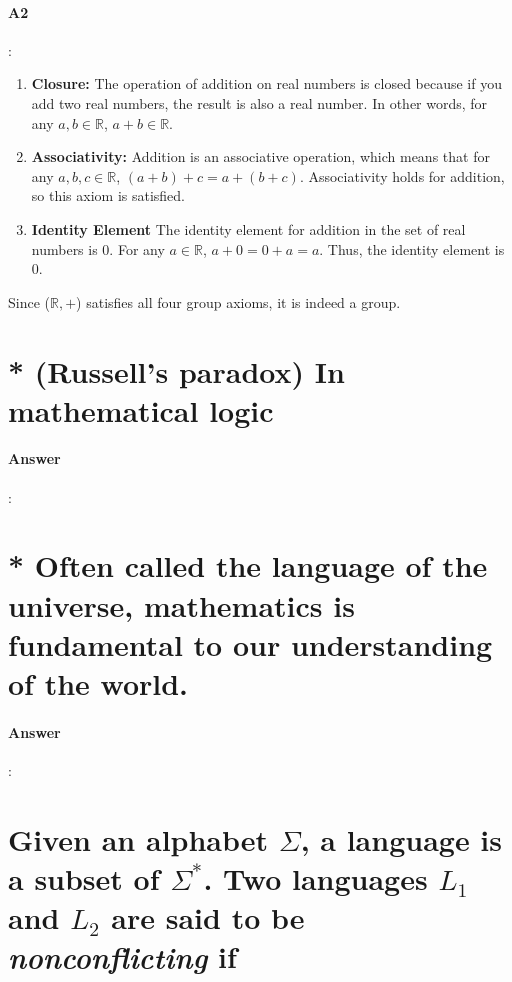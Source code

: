 \documentclass{article}
\begin{document}
\paragraph{A2}:


\begin{enumerate}
  \item \textbf{Closure:} The operation of addition on real numbers is closed because if you add two real numbers, the result is also a real number. In other words, for any $a, b \in \mathbb{R}$, $a + b \in \mathbb{R}$.
  \item \textbf{Associativity:} Addition is an associative operation, which means that for any $a, b, c \in \mathbb{R}$, $(a + b) + c = a + (b + c)$. Associativity holds for addition, so this axiom is satisfied.
  \item \textbf{Identity Element} The identity element for addition in the set of real numbers is 0. For any $a \in \mathbb{R}$, $a + 0 = 0 + a = a$. Thus, the identity element is 0.
\end{enumerate}

Since ($\mathbb{R}, +$) satisfies all four group axioms, it is indeed a group.



\section{* (Russell’s paradox) In mathematical logic}

\paragraph{Answer}:

\section{* Often called the language of the universe, mathematics is fundamental to our understanding of the world.}

\paragraph{Answer}:

\section{Given an alphabet $\Sigma$, a language is a subset of $\Sigma^*$. Two languages $L_1$ and $L_2$ are said to be \textit{nonconflicting} if}
\end{document}
